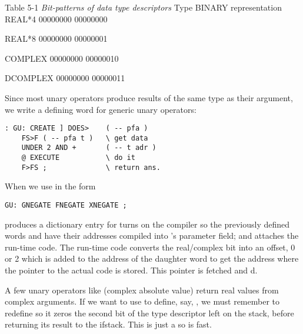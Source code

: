 Table 5-1 \textit{Bit-patterns of data type descriptors}
Type BINARY representation
REAL*4      00000000 00000000

REAL*8      00000000 00000001

COMPLEX     00000000 00000010

DCOMPLEX    00000000 00000011

Since most unary operators produce results of the same type as their argument, we write a defining word for generic unary operators:

\begin{lstlisting}
: GU: CREATE ] DOES>    ( -- pfa )
    FS>F ( -- pfa t )   \ get data
    UNDER 2 AND +       ( -- t adr )
    @ EXECUTE           \ do it
    F>FS ;              \ return ans.
\end{lstlisting}

When we use  in the form
\begin{lstlisting}
GU: GNEGATE FNEGATE XNEGATE ;
\end{lstlisting}

 produces a dictionary entry for \bc{GNEGATE; ]} turns on the compiler so the previously defined words  and  have their addresses compiled into 's parameter field; and  attaches the run-time code. The run-time code converts the real/complex bit into an offset, 0 or 2 which is added to the address of the daughter word to get the address where the pointer to the actual code is stored. This pointer is fetched and d.

A few unary operators like  (complex absolute value) return real values from complex arguments. If we want to use  to define, say, , we must remember to redefine  so it zeros the second bit of the type descriptor left on the stack, before returning its result to the ifstack. This is just a  so is fast.

